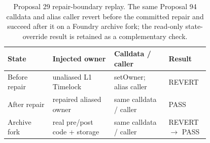 \begin{table}[t]\centering\scriptsize
\caption{Proposal 29 repair-boundary replay. The same Proposal 94 calldata and alias caller revert before the committed repair and succeed after it on a Foundry archive fork; the read-only state-override result is retained as a complementary check.}
\label{tab:proposal29-isolation}
\begin{tabular}{@{}p{0.19\linewidth}p{0.26\linewidth}p{0.23\linewidth}p{0.11\linewidth}@{}}\toprule
State & Injected owner & Calldata / caller & Result \\ \midrule
Before repair & unaliased L1 Timelock & setOwner; alias caller & REVERT \\
After repair & repaired aliased owner & same calldata / caller & PASS \\
Archive fork & real pre/post code + storage & same calldata / caller & REVERT $\rightarrow$ PASS \\
\bottomrule
\end{tabular}
\end{table}
